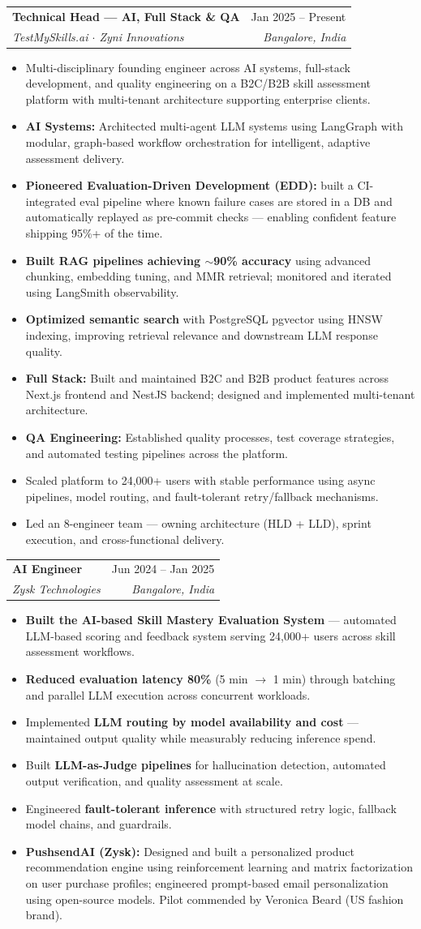 \documentclass[letterpaper,11pt]{article}
\makeatletter
\newcommand{\resumeItem}[1]{
  \item\small{
    {#1 \vspace{-2pt}}
  }
}
\newcommand{\resumeSubheading}[4]{
  \vspace{-2pt}\item
    \begin{tabular*}{0.97\textwidth}[t]{l@{\extracolsep{\fill}}r}
      \textbf{#1} & #2 \\
      \textit{\small#3} & \textit{\small #4} \\
    \end{tabular*}\vspace{-7pt}
}
\newcommand{\resumeItemListStart}{\begin{itemize}}
\newcommand{\resumeItemListEnd}{\end{itemize}\vspace{-5pt}}
\makeatother
\begin{document}
    \resumeSubheading
      {Technical Head --- AI, Full Stack \& QA}{Jan 2025 -- Present}
      {TestMySkills.ai $\cdot$ Zyni Innovations}{Bangalore, India}
      \resumeItemListStart
        \resumeItem{Multi-disciplinary founding engineer across AI systems, full-stack development, and quality engineering on a B2C/B2B skill assessment platform with multi-tenant architecture supporting enterprise clients.}
        \resumeItem{\textbf{AI Systems:} Architected multi-agent LLM systems using LangGraph with modular, graph-based workflow orchestration for intelligent, adaptive assessment delivery.}
        \resumeItem{\textbf{Pioneered Evaluation-Driven Development (EDD):} built a CI-integrated eval pipeline where known failure cases are stored in a DB and automatically replayed as pre-commit checks --- enabling confident feature shipping 95\%+ of the time.}
        \resumeItem{\textbf{Built RAG pipelines achieving $\sim$90\% accuracy} using advanced chunking, embedding tuning, and MMR retrieval; monitored and iterated using LangSmith observability.}
        \resumeItem{\textbf{Optimized semantic search} with PostgreSQL pgvector using HNSW indexing, improving retrieval relevance and downstream LLM response quality.}
        \resumeItem{\textbf{Full Stack:} Built and maintained B2C and B2B product features across Next.js frontend and NestJS backend; designed and implemented multi-tenant architecture.}
        \resumeItem{\textbf{QA Engineering:} Established quality processes, test coverage strategies, and automated testing pipelines across the platform.}
        \resumeItem{Scaled platform to 24,000+ users with stable performance using async pipelines, model routing, and fault-tolerant retry/fallback mechanisms.}
        \resumeItem{Led an 8-engineer team --- owning architecture (HLD + LLD), sprint execution, and cross-functional delivery.}
      \resumeItemListEnd

    \resumeSubheading
      {AI Engineer}{Jun 2024 -- Jan 2025}
      {Zysk Technologies}{Bangalore, India}
      \resumeItemListStart
        \resumeItem{\textbf{Built the AI-based Skill Mastery Evaluation System} --- automated LLM-based scoring and feedback system serving 24,000+ users across skill assessment workflows.}
        \resumeItem{\textbf{Reduced evaluation latency 80\%} (5 min $\rightarrow$ 1 min) through batching and parallel LLM execution across concurrent workloads.}
        \resumeItem{Implemented \textbf{LLM routing by model availability and cost} --- maintained output quality while measurably reducing inference spend.}
        \resumeItem{Built \textbf{LLM-as-Judge pipelines} for hallucination detection, automated output verification, and quality assessment at scale.}
        \resumeItem{Engineered \textbf{fault-tolerant inference} with structured retry logic, fallback model chains, and guardrails.}
        \resumeItem{\textbf{PushsendAI (Zysk):} Designed and built a personalized product recommendation engine using reinforcement learning and matrix factorization on user purchase profiles; engineered prompt-based email personalization using open-source models. Pilot commended by Veronica Beard (US fashion brand).}
      \resumeItemListEnd
\end{document}

